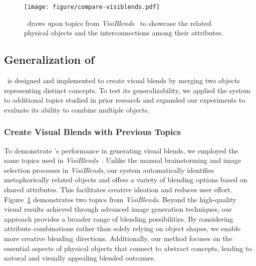 \begin{figure}[b]
  \centering
  \texttt{[image: figure/compare-visiblends.pdf]}
  \caption{\sysname\ draws upon topics from \textit{VisiBlends}~\cite{10.1145/3290605.3300402} to showcase the related physical objects and the interconnections among their attributes.
  }
  \label{fig:compare-visiblend}
\end{figure}





\subsection{Generalization of \sysname}




\sysname\ is designed and implemented to create visual blends by merging two objects representing distinct concepts.
To test its generalizability, we applied the system to additional topics studied in prior research and expanded our experiments to evaluate its ability to combine multiple objects.




\subsubsection{Create Visual Blends with Previous Topics}



To demonstrate \sysname's performance in generating visual blends, we employed the same topics used in \textit{VisiBlends}~\cite{10.1145/3290605.3300402}.
Unlike the manual brainstorming and image selection processes in \textit{VisiBlends}, our system automatically identifies metaphorically related objects and offers a variety of blending options based on shared attributes. 
This facilitates creative ideation and reduces user effort. 
Figure~\ref{fig:compare-visiblend} demonstrates two topics from \textit{VisiBlends}. 
Beyond the high-quality visual results achieved through advanced image generation techniques, our approach provides a broader range of blending possibilities. 
By considering attribute combinations rather than solely relying on object shapes, we enable more creative blending directions. 
Additionally, our method focuses on the essential aspects of physical objects that connect to abstract concepts, leading to natural and visually appealing blended outcomes.






